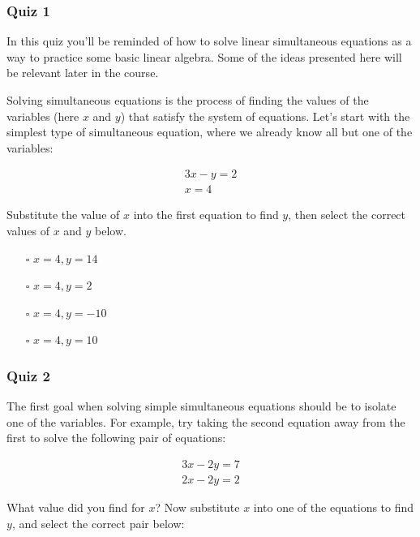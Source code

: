 \documentclass[]{article}
\begin{document}
\subsubsection{Quiz 1}

In this quiz you'll be reminded of how to solve linear simultaneous equations as a way to practice some basic linear algebra. Some of the ideas presented here will be relevant later in the course.

Solving simultaneous equations is the process of finding the values of the variables (here $ x $ and $ y $) that satisfy the system of equations. Let's start with the simplest type of simultaneous equation, where we already know all but one of the variables:

\begin{equation} \label{}
\begin{split}
	3x - y = 2 \\
	x = 4
\end{split}
\end{equation}

Substitute the value of $ x $ into the first equation to find $ y $, then select the correct values of $ x $ and $ y $ below.

\begin{itemize}
	\item[$\square$] $ x = 4, y = 14 $
	\item[$\square$] $ x = 4, y = 2 $
	\item[$\square$] $ x = 4, y = -10 $
	\item[$\square$] $ x = 4, y = 10 $
\end{itemize}

\subsubsection{Quiz 2}

The first goal when solving simple simultaneous equations should be to isolate one of the variables. For example, try taking the second equation away from the first to solve the following pair of equations:

\begin{equation} \label{}
\begin{split}
3x - 2y = 7 \\
2x - 2y = 2
\end{split}
\end{equation}

What value did you find for $ x $? Now substitute $ x $ into one of the equations to find $ y $, and select the correct pair below:
\end{document}
